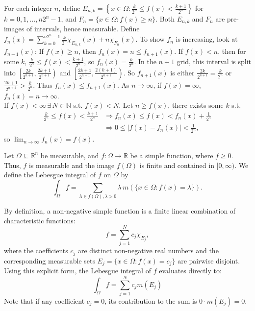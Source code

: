 \begin{pfbox}
    For each integer $n$, define $E_{n,k} = \left\{x \in \Omega : \frac{k}{2^n} \le f(x) < \frac{k+1}{2^n}\right\}$ for $k = 0, 1, \dots, n2^n-1$, and $F_n = \{x \in \Omega : f(x) \ge n\}$. Both $E_{n,k}$ and $F_n$ are pre-images of intervals, hence measurable.
    Define $f_n(x) = \displaystyle\sum_{k=0}^{n2^n-1} \frac{k}{2^n} \chi_{E_{n,k}}(x) + n \chi_{F_n}(x)$. 
    To show $f_n$ is increasing, look at $f_{n+1}(x)$:
    If $f(x) \ge n$, then $f_n(x) = n \le f_{n+1}(x)$.
    If $f(x) < n$, then for some $k$, $\frac{k}{2^n} \le f(x) < \frac{k+1}{2^n}$, so $f_n(x) = \frac{k}{2^n}$. In the $n+1$ grid, this interval is split into $\left[\frac{2k}{2^{n+1}}, \frac{2k+1}{2^{n+1}}\right)$ and $\left[\frac{2k+1}{2^{n+1}}, \frac{2(k+1)}{2^{n+1}}\right)$. So $f_{n+1}(x)$ is either $\frac{2k}{2^{n+1}} = \frac{k}{2^n}$ or $\frac{2k+1}{2^{n+1}} > \frac{k}{2^n}$. Thus $f_n(x) \le f_{n+1}(x)$.
    As $n \to \infty$, if $f(x) = \infty$, $f_n(x) = n \to \infty$.\\
    If $f(x) < \infty\,\exists\,N\in\mathbb{N}$ s.t. $f(x)<N$. Let $n \ge f(x)$, there exists some $k$ s.t. 
    \begin{align*}
        \frac{k}{2^n}\le f(x) < \frac{k+1}{2^n} &\Rightarrow f_n(x)\le f(x)<f_n(x)+\frac{1}{2^n}\\
        &\Rightarrow 0 \le |f(x) - f_n(x)| < \frac{1}{2^n},
    \end{align*}
    so $\displaystyle\lim_{n\to\infty} f_n(x) = f(x)$.
\end{pfbox}

\begin{definition}
    Let $\Omega \subseteq \mathbb{R}^n$ be measurable, and $f:\Omega \rightarrow \mathbb{R}$ be a simple function, where $f \ge 0$. Thus, $f$ is measurable and the image $f(\Omega)$ is finite and contained in $[0, \infty)$. We define the Lebesgue integral of $f$ on $\Omega$ by
    \[ \displaystyle\int_{\Omega} f = \displaystyle\sum_{\lambda \in f(\Omega), \lambda > 0} \lambda \, m(\{x \in \Omega : f(x) = \lambda\}). \]
\end{definition}

\begin{remark}
    By definition, a non-negative simple function is a finite linear combination of characteristic functions:
    \[ f = \displaystyle\sum_{j=1}^N c_j \chi_{E_j}, \]
    where the coefficients $c_j$ are distinct non-negative real numbers and the corresponding measurable sets $E_j = \{x \in \Omega : f(x) = c_j\}$ are pairwise disjoint. 
    Using this explicit form, the Lebesgue integral of $f$ evaluates directly to:
    \[ \displaystyle\int_{\Omega} f = \displaystyle\sum_{j=1}^N c_j m(E_j) \]
    Note that if any coefficient $c_j = 0$, its contribution to the sum is $0 \cdot m(E_j) = 0$. 
\end{remark}


